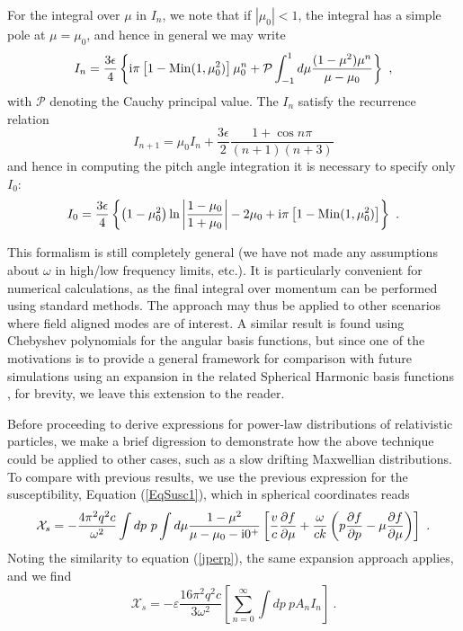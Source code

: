 \documentclass[a4paper,fleqn,usenatbib]{mnras}
\newcommand{\eqnb}{\begin{equation*}}
\newcommand{\eqne}{\end{equation*}}
\begin{document}
For the integral over $\mu$ in $I_n$, we note that if $|\mu_0|<1$, the integral has a simple pole at $\mu=\mu_0$, and hence in general we may write
\eqnb 
 I_n=  \frac{3 \epsilon}{4} \left \lbrace  {\rm i }\pi \left[ 1-{\rm Min}(1,\mu_0^2)\right]\mu_0^n +\mathcal{ P} \int_{-1}^1 d\mu \frac{(1-\mu^2)\mu^n} {\mu-\mu_0 } 
  \right\rbrace ~,
 \label{Eq:In}
\eqne
with $\mathcal{P}$ denoting the Cauchy principal value. The $I_n$ satisfy the recurrence relation
\eqnb
I_{n+1} = \mu_0 I_n + \frac{3  \epsilon}{2} \frac{1+\cos n\pi}{(n+1)(n+3)}
\eqne
and hence in computing the pitch angle integration it is necessary to specify only $I_0$:
\eqnb
I_0 = \frac{3 \epsilon}{4} \left \lbrace
\left(1-\mu_0^2\right)\ln\left|\frac{1-\mu_0}{1+\mu_0} \right|
-2\mu_0  + {\rm i }\pi \left[ 1-{\rm Min}(1,\mu_0^2)\right]\right\rbrace
~.
\eqne


This formalism is still completely general (we have not made any assumptions about $\omega$ in high/low frequency limits, etc.). It is particularly convenient for numerical calculations, as the final integral over momentum can be performed using standard methods. The approach may thus be applied to other scenarios where field aligned modes are of interest.
A similar result is found using Chebyshev polynomials for the angular basis functions, but since one of the motivations is to provide a general framework for comparison with future simulations using an expansion in the related Spherical Harmonic basis functions \citep{Reville13}, for brevity, we leave this extension to the reader.

Before proceeding to derive expressions for power-law distributions of relativistic particles, we make a brief digression to demonstrate how the above technique could be applied to other cases, such as a slow drifting Maxwellian distributions. To compare with previous results, we use the previous expression for the susceptibility,  Equation (\ref{EqSusc1}), which in spherical coordinates reads
\eqnb
\mathcal{X}_s = -\frac{4 \pi^2 q^2 c}{ \omega^2} \int dp ~ p \int d\mu  \frac{1-\mu^2}{\mu - \mu_0 -  {\rm i}0^+}
\left[ \frac{v}{c}\frac{\partial f}{\partial \mu}
+\frac{\omega}{ck} \left( p \frac{\partial f}{\partial p}- \mu\frac{\partial f}{\partial \mu} \right) \right]~.
\eqne
Noting the similarity to equation (\ref{jperp}), the same expansion approach applies, and we find
\eqnb
\mathcal{X}_s =-\varepsilon\frac{  16 \pi^2 q^2 c}{3 \omega^2}  \left[ \sum_{n=0}^\infty \int dp~ p  A_n I_n \right] ~.
\eqne
\end{document}
